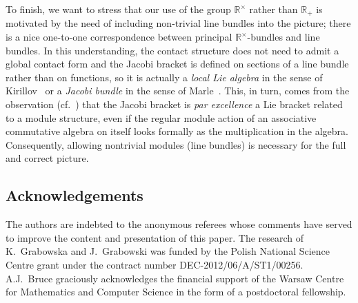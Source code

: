 \documentclass[pdftex]{sigma}
\numberwithin{equation}{section}
\begin{document}
To f\/inish, we want to stress that our use of the group ${\mathbb R}^\times$ rather than ${\mathbb R}_+$ is motivated by the need of including non-trivial line bundles into the picture; there is a nice one-to-one correspondence between principal ${\mathbb R}^\times$-bundles and line bundles. In this understanding, the contact structure does not need to admit a global contact form and the Jacobi bracket is def\/ined on sections of a line bundle rather than on functions, so it is actually a \emph{local Lie algebra} in the sense of Kirillov~\cite{Kirillov:1976} or a \emph{Jacobi bundle} in the sense of Marle~\cite{Marle:1991}. This, in turn, comes from the observation (cf.~\cite[Remark~2.4]{Grabowski2013}) that the Jacobi bracket is \emph{par excellence} a Lie bracket related to a module structure, even if the regular module action of an associative commutative algebra on itself looks formally as the multiplication in the algebra. Consequently, allowing nontrivial modules (line bundles) is necessary for the full and correct picture.


\subsection*{Acknowledgements}

The authors are indebted to the anonymous referees whose comments have served to improve the content and presentation of this paper. The research of K.~Grabowska and J.~Grabowski  was funded by the  Polish National Science Centre grant under the contract number DEC-2012/06/A/ST1/00256. A.J.~Bruce graciously acknowledges the f\/inancial support of the Warsaw Centre for Mathematics and Computer Science in the form of a postdoctoral fellowship.
\end{document}
